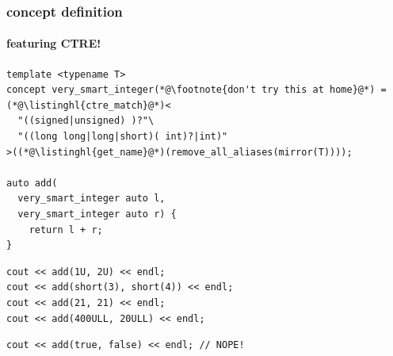 \documentclass[compress,table,xcolor=table]{beamer}
\begin{document}
\begin{frame}[fragile]
  \frametitle{ concept definition}
  \framesubtitle{featuring CTRE!}
  \begin{lstlisting}[language=c++2x,basicstyle=\footnotesize\ttfamily]
template <typename T>
concept very_smart_integer(*@\footnote{don't try this at home}@*) = (*@\listinghl{ctre_match}@*)<
  "((signed|unsigned) )?"\
  "((long long|long|short)( int)?|int)"
>((*@\listinghl{get_name}@*)(remove_all_aliases(mirror(T))));

auto add(
  very_smart_integer auto l,
  very_smart_integer auto r) {
    return l + r;
}
  \end{lstlisting}
  \vfill
  \begin{lstlisting}[language=c++2x,basicstyle=\footnotesize\ttfamily]
cout << add(1U, 2U) << endl;
cout << add(short(3), short(4)) << endl;
cout << add(21, 21) << endl;
cout << add(400ULL, 20ULL) << endl;
  \end{lstlisting}
  \begin{lstlisting}[language=c++2x,basicstyle=\footnotesize\ttfamily]
cout << add(true, false) << endl; // NOPE!
  \end{lstlisting}
\end{frame}
\end{document}
